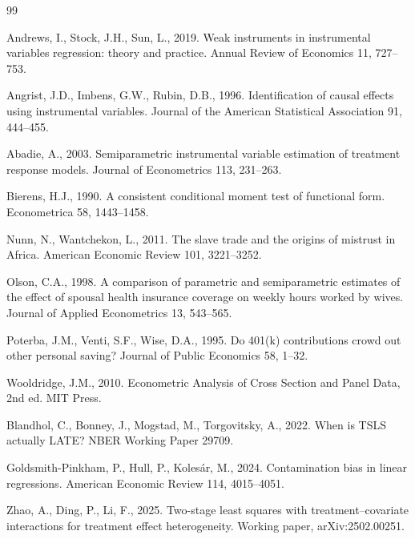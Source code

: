 \documentclass[preprint,11pt,authoryear]{elsarticle}
\theoremstyle{definition}
\begin{document}
\clearpage
\begin{thebibliography}{99}

Andrews, I., Stock, J.H., Sun, L., 2019. Weak instruments in instrumental
variables regression: theory and practice. Annual Review of Economics 11,
727--753.

Angrist, J.D., Imbens, G.W., Rubin, D.B., 1996. Identification of causal effects
using instrumental variables. Journal of the American Statistical Association 91,
444--455.

Abadie, A., 2003. Semiparametric instrumental variable estimation of treatment
response models. Journal of Econometrics 113, 231--263.

Bierens, H.J., 1990. A consistent conditional moment test of functional form.
Econometrica 58, 1443--1458.

Nunn, N., Wantchekon, L., 2011. The slave trade and the origins of mistrust in
Africa. American Economic Review 101, 3221--3252.

Olson, C.A., 1998. A comparison of parametric and semiparametric estimates of the
effect of spousal health insurance coverage on weekly hours worked by wives. Journal
of Applied Econometrics 13, 543--565.

Poterba, J.M., Venti, S.F., Wise, D.A., 1995. Do 401(k) contributions crowd out
other personal saving? Journal of Public Economics 58, 1--32.

Wooldridge, J.M., 2010. Econometric Analysis of Cross Section and Panel Data, 2nd
ed. MIT Press.

Blandhol, C., Bonney, J., Mogstad, M., Torgovitsky, A., 2022. When is TSLS
actually LATE? NBER Working Paper 29709.

Goldsmith-Pinkham, P., Hull, P., Koles{\'a}r, M., 2024. Contamination bias in
linear regressions. American Economic Review 114, 4015--4051.

Zhao, A., Ding, P., Li, F., 2025. Two-stage least squares with treatment--covariate
interactions for treatment effect heterogeneity. Working paper, arXiv:2502.00251.


\end{thebibliography}
\end{document}

